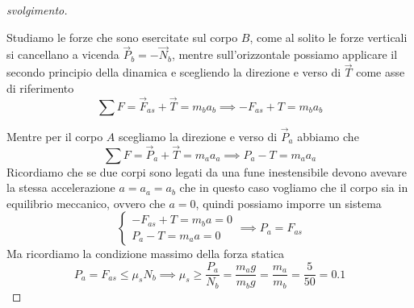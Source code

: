 \documentclass{rapport}
\begin{document}
\begin{proof}[svolgimento]
\begin{figure}[h]
\end{figure}

Studiamo le forze che sono esercitate sul corpo $B$, come al solito le forze verticali si cancellano a vicenda $\vec{P}_b= -\vec{N}_b$, mentre sull'orizzontale possiamo applicare il secondo principio della dinamica e scegliendo la direzione e verso di $\vec{T}$ come asse di riferimento 
\[
\sum F = \vec{F}_{as} + \vec{T} = m_b a_b  \implies -F_{as} + T = m_ba_b
\] 

Mentre per il corpo $A$ scegliamo la direzione e verso di $\vec{P}_a$ abbiamo che 
\[
\sum F = \vec{P}_{a} + \vec{T} = m_a a_a  \implies P_{a} - T = m_aa_a
\]
Ricordiamo che se due corpi sono legati da una fune inestensibile devono avevare la stessa accelerazione $a = a_a = a_b$ che in questo caso vogliamo che il corpo sia in equilibrio meccanico, ovvero che $a=0$, quindi possiamo imporre un sistema 
\[
\begin{cases}
  -F_{as} + T = m_ba  = 0\\
  P_{a} - T = m_aa = 0
\end{cases} \implies P_{a} = F_{as}
\]
Ma ricordiamo la condizione massimo della forza statica 
\[
P_{a} = F_{as} \leq \mu_s N_b \implies \mu_s \geq \dfrac{P_a}{N_b} = \dfrac{m_a g}{m_b  g} =\dfrac{m_a }{m_b  }  = \dfrac{5}{50} = 0.1 
\]
\end{proof}
\end{document}
